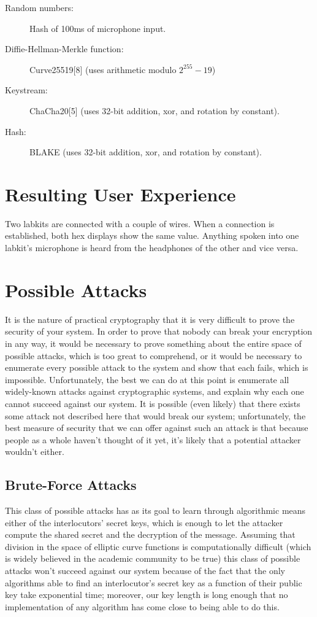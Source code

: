 \documentclass[a4paper]{report}
\begin{document}
\begin{description}
  \item[Random numbers:] Hash of 100ms of microphone input.
  \item[Diffie-Hellman-Merkle function:] Curve25519[8] (uses arithmetic modulo $2^{255}-19$)
  \item[Keystream:] ChaCha20[5] (uses 32-bit addition, xor, and rotation by constant).
  \item[Hash:] BLAKE (uses 32-bit addition, xor, and rotation by constant).
\end{description}

\section{Resulting User Experience}

Two labkits are connected with a couple of wires. When a connection is
established, both hex displays show the same value. Anything spoken into one
labkit's microphone is heard from the headphones of the other and vice versa.

\section{Possible Attacks}

It is the nature of practical cryptography that it is very difficult to prove the security of your system. In order to prove that nobody can break your encryption in any way, it would be necessary to prove something about the entire space of possible attacks, which is too great to comprehend, or it would be necessary to enumerate every possible attack to the system and show that each fails, which is impossible. Unfortunately, the best we can do at this point is enumerate all widely-known attacks against cryptographic systems, and explain why each one cannot succeed against our system. It is possible (even likely) that there exists some attack not described here that would break our system; unfortunately, the best measure of security that we can offer against such an attack is that because people as a whole haven't thought of it yet, it's likely that a potential attacker wouldn't either.

\subsection{Brute-Force Attacks} 

This class of possible attacks has as its goal to learn through algorithmic means either of the interlocutors' secret keys, which is enough to let the attacker compute the shared secret and the decryption of the message. Assuming that division in the space of elliptic curve functions is computationally difficult (which is widely believed in the academic community to be true) this class of possible attacks won't succeed against our system because of the fact that the only algorithms able to find an interlocutor's secret key as a function of their public key take exponential time; moreover, our key length is long enough that no implementation of any algorithm has come close to being able to do this.
\end{document}
